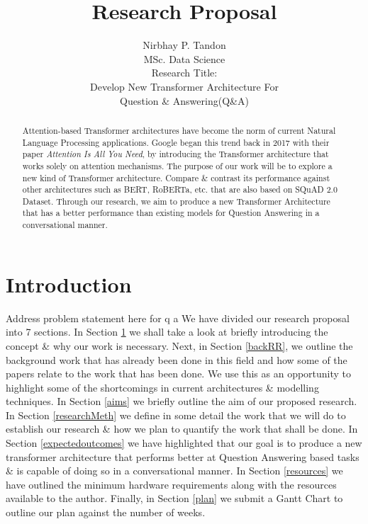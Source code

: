 \documentclass[11pt]{article}
\begin{document}
\title{Research Proposal}

\author{Nirbhay P. Tandon\\MSc. Data Science\\
    Research Title:\\Develop New Transformer Architecture For \\ Question \& Answering(Q\&A)
}
\date{}
\maketitle

\newpage
\begin{abstract}
Attention-based Transformer architectures have become the norm of current Natural Language Processing applications. Google began this trend back in 2017 with their paper \textit{Attention Is All You Need}\cite{atayl}, by introducing the Transformer architecture that works solely on attention mechanisms. The purpose of our work will be to explore a new kind of Transformer architecture. Compare \& contrast its performance against other architectures such as BERT\cite{bert}, RoBERTa\cite{roberta}, etc. that are also based on SQuAD 2.0 Dataset\cite{dataset}. Through our research, we aim to produce a new Transformer Architecture that has a better performance than existing models for Question Answering in a conversational manner.
\end{abstract}
\newpage
\tableofcontents
\newpage
\section{Introduction}\label{introduction}

Address problem statement here for q a
We have divided our research proposal into 7 sections.
In Section \ref{introduction} we shall take a look at briefly introducing the concept \& why our work is necessary. Next, in Section \ref{backRR}, we outline the background work that has already been done in this field and how some of the papers relate to the work that has been done. We use this as an opportunity to highlight some of the shortcomings in current architectures \& modelling techniques. In Section \ref{aims} we briefly outline the aim of our proposed research. In Section \ref{researchMeth} we define in some detail the work that we will do to establish our research \& how we plan to quantify the work that shall be done. In Section \ref{expectedoutcomes} we have highlighted that our goal is to produce a new transformer architecture that performs better at Question Answering based tasks \& is capable of doing so in a conversational manner.
In Section \ref{resources} we have outlined the minimum hardware requirements along with the resources available to the author. Finally, in Section \ref{plan} we submit a Gantt Chart to outline our plan against the number of weeks.
\end{document}
